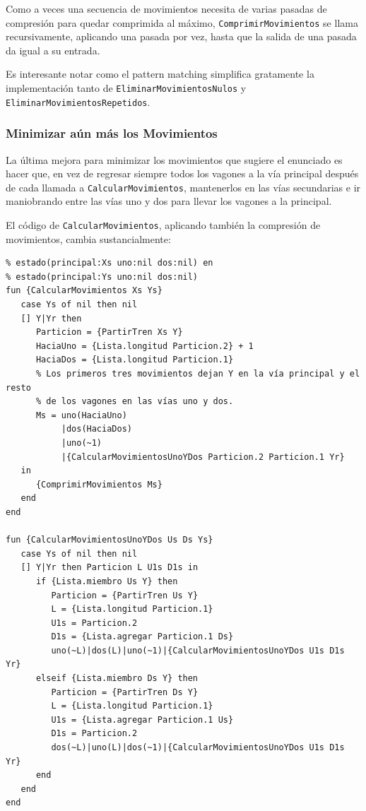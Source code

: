 \documentclass[12pt,titlepage]{article}
\begin{document}
Como a veces una secuencia de movimientos necesita de varias pasadas de compresión para quedar comprimida al máximo, \lstinline|ComprimirMovimientos| se llama recursivamente, aplicando una pasada por vez, hasta que la salida de una pasada da igual a su entrada.

Es interesante notar como el pattern matching simplifica gratamente la implementación tanto de \lstinline|EliminarMovimientosNulos| y \lstinline|EliminarMovimientosRepetidos|.

\subsubsection{Minimizar aún más los Movimientos}

La última mejora para minimizar los movimientos que sugiere el enunciado es hacer que, en vez de regresar siempre todos los vagones a la vía principal después de cada llamada a \lstinline|CalcularMovimientos|, mantenerlos en las vías secundarias e ir maniobrando entre las vías uno y dos para llevar los vagones a la principal. 

El código de \lstinline|CalcularMovimientos|, aplicando también la compresión de movimientos, cambia sustancialmente:
\begin{lstlisting}[basicstyle=\ttfamily\footnotesize]
% Devuelve la lista de movimientos necesarios para transformar el estado
% estado(principal:Xs uno:nil dos:nil) en 
% estado(principal:Ys uno:nil dos:nil)
fun {CalcularMovimientos Xs Ys}
   case Ys of nil then nil
   [] Y|Yr then
      Particion = {PartirTren Xs Y}
      HaciaUno = {Lista.longitud Particion.2} + 1
      HaciaDos = {Lista.longitud Particion.1}
      % Los primeros tres movimientos dejan Y en la vía principal y el resto
      % de los vagones en las vías uno y dos.
      Ms = uno(HaciaUno)
           |dos(HaciaDos)
           |uno(~1)
           |{CalcularMovimientosUnoYDos Particion.2 Particion.1 Yr}
   in
      {ComprimirMovimientos Ms}
   end
end

fun {CalcularMovimientosUnoYDos Us Ds Ys}
   case Ys of nil then nil
   [] Y|Yr then Particion L U1s D1s in
      if {Lista.miembro Us Y} then
         Particion = {PartirTren Us Y}
         L = {Lista.longitud Particion.1}
         U1s = Particion.2
         D1s = {Lista.agregar Particion.1 Ds}
         uno(~L)|dos(L)|uno(~1)|{CalcularMovimientosUnoYDos U1s D1s Yr}
      elseif {Lista.miembro Ds Y} then
         Particion = {PartirTren Ds Y}
         L = {Lista.longitud Particion.1}
         U1s = {Lista.agregar Particion.1 Us}
         D1s = Particion.2
         dos(~L)|uno(L)|dos(~1)|{CalcularMovimientosUnoYDos U1s D1s Yr}
      end
   end
end
\end{lstlisting}
\end{document}
